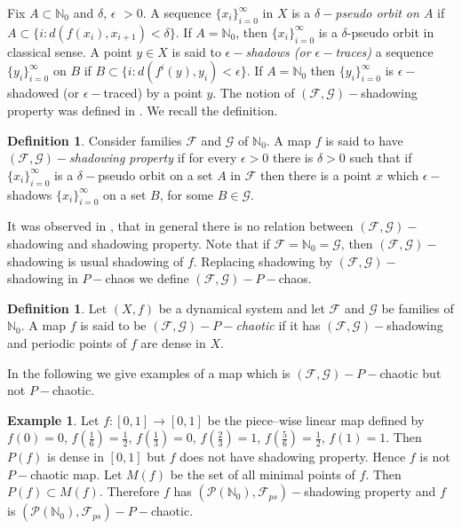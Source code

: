 \documentclass{amsart}[12pt, papera4]
\theoremstyle{definition}
\newtheorem{definition}[theorem]{Definition}
\newtheorem{example}[theorem]{Example}
\theoremstyle{remark}
\numberwithin{equation}{section}
\def\N{{\mathbb N}}
\def\F{{\mathscr{F}}}
\def\G{{\mathscr{G}}}
\begin{document}
\smallskip
\noindent Fix $A\subset \mathbb{N}_0$ and $\delta$, $\epsilon$ $>0$. A sequence $\{x_i\}_{i=0}^{\infty}$ in $X$ is a \emph{$\delta-$pseudo orbit on $A$} if $A\subset \{i:d(f(x_i),x_{i+1})<\delta\}.$ If $A=\N_0$, then $\{x_i\}_{i=0}^{\infty}$ is a $\delta$-pseudo orbit in classical sense. A point $y\in X$ is said to \emph{$\epsilon-$shadows (or $\epsilon-$traces)} a sequence $\{y_i\}_{i=0}^{\infty}$ on $B$ if $B\subset \{i:d(f^i(y),y_i)<\epsilon\}$. If $A=\mathbb{N}_0$ then $\{y_i\}_{i=0}^{\infty}$ is $\epsilon-$shadowed (or $\epsilon-$traced) by a point $y$. The notion of $(\F,\G)-$shadowing property was defined in \cite{Oprocha}. We recall the definition.

\begin{definition}
	Consider families $\mathscr{F}$ and $\mathscr{G}$ of $\mathbb{N}_0$. A map $f$ is said to have \emph{$(\mathscr{F},\mathscr{G})-$shadowing property} if for every $\epsilon>0$ there is $\delta>0$ such that if $\{x_i\}_{i=0}^{\infty}$ is a $\delta-$pseudo orbit on a set $A$ in $\mathscr{F}$ then there is a point $x$ which $\epsilon-$shadows $\{x_i\}_{i=0}^{\infty}$ on a set $B$, for some $B\in \mathscr{G}$. 
\end{definition}

\smallskip
\noindent It was observed in \cite{Oprocha}, that in general there is no relation between $(\F,\G)-$shadowing and shadowing property. Note that if $\F=\N_0=\G$, then $(\F,\G)-$shadowing is usual shadowing of $f$. Replacing shadowing by $(\F,\G)-$shadowing in $P-$chaos we define $(\F,\G)-P-$chaos. 
\begin{definition} 
	Let $(X,f)$ be a dynamical system and let $\mathscr{F}$ and $\mathscr{G}$ be families of $\mathbb{N}_0$. A map $f$ is said to be \emph{$(\mathscr{F},\mathscr{G})-P-$chaotic} if it has $(\mathscr{F},\mathscr{G})-$shadowing and periodic points of $f$ are dense in $X$.
\end{definition}

\noindent In the following we give examples of a map which is $(\F,\G)-P-$chaotic but not $P-$chaotic.
\begin{example}\label{2.11}
	Let $f:[0,1]\longrightarrow [0,1]$ be the piece--wise linear map defined by $f(0)=0$, $f(\frac{1}{6})=\frac{1}{2}$, $f(\frac{1}{3})=0$, $f(\frac{2}{3})=1$, $f(\frac{5}{6})=\frac{1}{2}$, $f(1)=1$. Then $P(f)$ is dense in $[0,1]$ but $f$ does not have shadowing property. Hence $f$ is not $P-$chaotic map. Let $M(f)$ be the set of all minimal points of $f$. Then $P(f)\subset M(f)$. Therefore $f$ has $(\mathscr{P}(\N_0),\F_{ps})-$shadowing property \cite{Oprocha} and $f$ is $(\mathscr{P}(\N_0),\F_{ps})-P-$chaotic.
\end{example}
\end{document}
